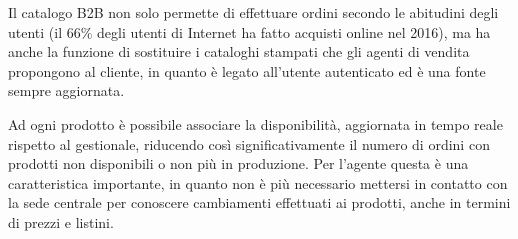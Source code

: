 Il catalogo B2B non solo permette di effettuare ordini secondo le abitudini degli utenti (il 66\% degli utenti di Internet ha fatto acquisti online nel 2016\autocite{bib:eurostat}), ma ha anche la funzione di sostituire i cataloghi stampati che gli agenti di vendita propongono al cliente, in quanto è legato all'utente autenticato ed è una fonte sempre aggiornata.

Ad ogni prodotto è possibile associare la disponibilità, aggiornata in tempo reale rispetto al gestionale, riducendo così significativamente il numero di ordini con prodotti non disponibili o non più in produzione. Per l'agente questa è una caratteristica importante, in quanto non è più necessario mettersi in contatto con la sede centrale per conoscere cambiamenti effettuati ai prodotti, anche in termini di prezzi e listini.


